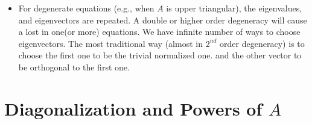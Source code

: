 \documentclass[a4paper,12pt]{article}
\theoremstyle{definition} \newtheorem{Theorem}{Theorem}
\begin{document}
\begin{itemize}
\begin{itemize}
\begin{itemize}
			\item For degenerate equations (e.g., when $A$ is upper triangular), the eigenvalues, and eigenvectors are repeated.
A double or higher order degeneracy will cause a lost in one(or more) equations. We have infinite number of ways to
choose eigenvectors. The most traditional way (almost in $2^{nd}$ order degeneracy) is to choose the first one to be the
trivial normalized one. and the other vector to be orthogonal to the first one.
		\end{itemize}
	\end{itemize}
\end{itemize}

\section{Diagonalization and Powers of $A$}
\end{document}
